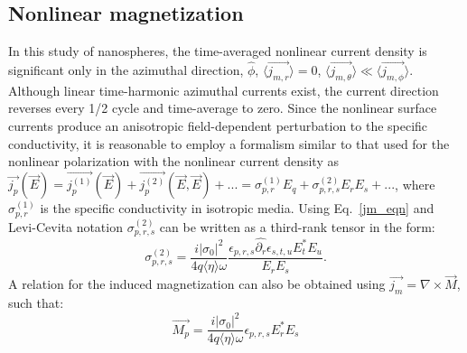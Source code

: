 \subsection{Nonlinear magnetization}
In this study of nanospheres, the time-averaged nonlinear current density is significant only in the azimuthal direction, $\hat{\phi}$, $\langle\vec{j_{m,r}}\rangle=0$, $\langle\vec{j_{m,\theta}}\rangle\ll \langle\vec{j_{m,\phi}}\rangle$. Although linear time-harmonic azimuthal currents exist, the current direction reverses every 1/2 cycle and time-average to zero. Since the nonlinear surface currents produce an anisotropic field-dependent perturbation to the specific conductivity, it is reasonable to employ a formalism similar to that used for the nonlinear polarization with the nonlinear current density as $\vec{j_p}(\vec{E}) = \vec{j^{(1)}_p}(\vec{E}) + \vec{j^{(2)}_p}(\vec{E},\vec{E}) + ... = \sigma_{p,r}^{(1)}E_q+\sigma_{p,r,s}^{(2)}E_rE_s+...$, where $\sigma^{(1)}_{p,r}$ is the specific conductivity in isotropic media. 
Using Eq.~\ref{jm_eqn} and Levi-Cevita notation $\sigma_{p,r,s}^{(2)}$ can be written as a third-rank tensor in the form:
\begin{equation}
\sigma_{p,r,s}^{(2)} = \frac{i|\sigma_0|^2}{4q\langle\eta\rangle\omega}\frac{\epsilon_{p,r,s} \hat{\partial_r}\epsilon_{s,t,u}E_t^*E_u}{E_{r}E_{s}}.
\label{DelSig}
\end{equation}
A relation for the induced magnetization can also be obtained using $\vec{j_m} = \nabla\times\vec{M}$, such that:
\begin{equation}
\vec{M_p} = \frac{i|\sigma_0|^2}{4q\langle\eta\rangle\omega}\epsilon_{p,r,s} E_{r}^*E_{s}
\end{equation}
